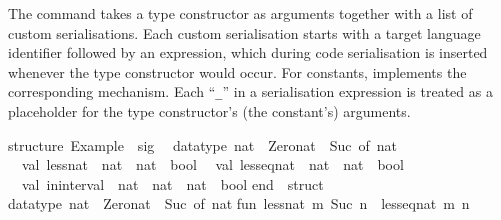 \begin{isabellebody}
\endisatagquotett
{\isafoldquotett}%
%
\isadelimquotett
%
\endisadelimquotett
%
\begin{isamarkuptext}%
\noindent The \hypertarget{command.code-type}{\hyperlink{command.code-type}{\mbox{}}} command takes a type constructor
  as arguments together with a list of custom serialisations.  Each
  custom serialisation starts with a target language identifier
  followed by an expression, which during code serialisation is
  inserted whenever the type constructor would occur.  For constants,
  \hypertarget{command.code-const}{\hyperlink{command.code-const}{\mbox{}}} implements the corresponding mechanism.  Each
  ``\verb|_|'' in a serialisation expression is treated as a
  placeholder for the type constructor's (the constant's) arguments.%
\end{isamarkuptext}%
\isamarkuptrue%
%
\isadelimquotetypewriter
%
\endisadelimquotetypewriter
%
\isatagquotetypewriter
%
\begin{isamarkuptext}%
structure\ Example\ {}\ sig\isanewline
\ \ datatype\ nat\ {}\ Zero{}nat\ {}\ Suc\ of\ nat\isanewline
\ \ val\ less{}nat\ {}\ nat\ {}{}\ nat\ {}{}\ bool\isanewline
\ \ val\ less{}eq{}nat\ {}\ nat\ {}{}\ nat\ {}{}\ bool\isanewline
\ \ val\ in{}interval\ {}\ nat\ {}\ nat\ {}{}\ nat\ {}{}\ bool\isanewline
end\ {}\ struct\isanewline
\isanewline
datatype\ nat\ {}\ Zero{}nat\ {}\ Suc\ of\ nat{}\isanewline
\isanewline
fun\ less{}nat\ m\ {}Suc\ n{}\ {}\ less{}eq{}nat\ m\ n\isanewline

\end{isamarkuptext}
\end{isabellebody}
